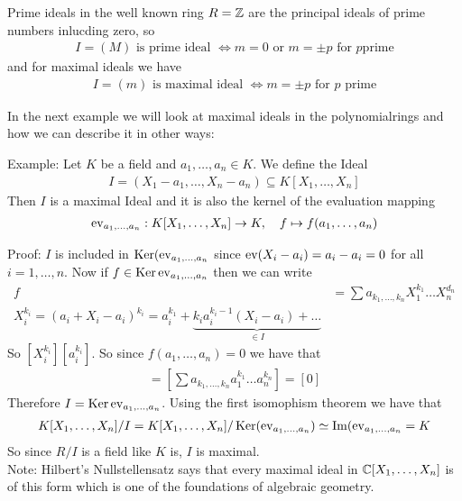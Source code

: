 Prime ideals in the well known ring $R = \mathbb{Z}$ are the principal ideals of prime numbers inlucding zero, so
\begin{align*}
I = (M) \text{ is prime ideal } \iff m = 0 \text{ or } m = \pm p \text{ for } p \text{prime}
\end{align*}
and for maximal ideals we have
\begin{align*}
	I = (m) \text{ is maximal ideal } \iff m = \pm p \text{ for $p$ prime}
\end{align*}


In the next example we will look at maximal ideals in the polynomialrings and how we can describe it in other ways:

Example: Let $K$ be a field and $a_1, \ldots, a_n \in K$. We define the Ideal
\begin{align*}
	I = (X_1 - a_1, \ldots, X_n - a_n) \subseteq K[X_1, \ldots, X_n]
\end{align*}
Then $I$ is a maximal Ideal and it is also the kernel of the evaluation mapping 
\begin{align*}
	\operatorname{ev}_{a_1, \ldots, a_n}: K[X_1, \ldots, X_n] \to K, \quad f \mapsto f(a_1, \ldots, a_n)
\end{align*}

Proof: $I$ is included in $\operatorname{Ker}(\operatorname{ev}_{a_1,\ldots,a_n}$ since
$\operatorname{ev}(X_i-a_i) = a_i - a_i = 0$ for all $i = 1, \ldots, n$.
Now if $f \in \operatorname{Ker} \operatorname{ev}_{a_{1}, \ldots, a_{n}}$ then we can write
\begin{align*}
	f &= \sum a_{k_{1}, \ldots, k_{n}} X_1^{k_1} \dots X_n^{d_n}\\
X_i^{k_i} = (a_i + X_i - a_i)^{k_i} = a_i^{k_1} + \underbrace{k_i a_i^{k_i-1}(X_i - a_i) + \ldots}_{\in I}
\end{align*}
So $[X_i^{k_i}] [a_i^{k_i}]$. So since $f(a_{1}, \ldots, a_{n}) = 0$ we have that
\begin{align*}
	[f] = \left[\sum a_{k_{1}, \ldots, k_{n}}a_1^{k_1} \dots a_n^{k_n}\right] = [0]
\end{align*}
Therefore $I = \operatorname{Ker} \operatorname{ev}_{a_{1}, \ldots, a_{n}}$. Using the first isomophism theorem we have that
\begin{align*}
	K[X_1, \ldots, X_n]/I = K[X_1, \ldots, X_n]/\operatorname{Ker}(\operatorname{ev}_{a_{1}, \ldots, a_{n}}) \simeq \operatorname{Im}(\operatorname{ev}_{a_{1}, \ldots, a_{n}} = K
\end{align*}
So since $R/I$ is a field like $K$ is, $I$ is maximal.\\



Note: Hilbert's Nullstellensatz says that every maximal ideal in $\mathbb{C}[X_1, \ldots, X_n]$ is of this form which is one of the foundations of algebraic geometry.





